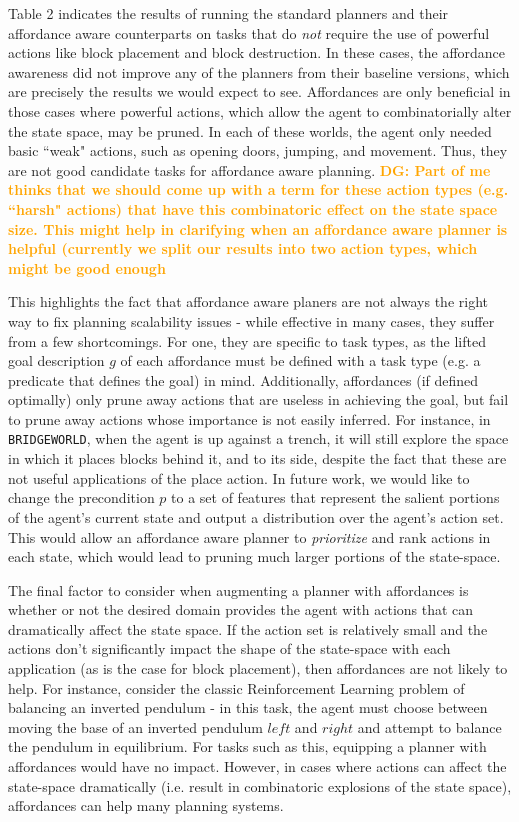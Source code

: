 \documentclass[]{article}
\newcommand{\dgnote}[1]{\textcolor{Orange}{\textbf{DG: #1}}}
\begin{document}
Table 2 indicates the results of running the standard planners and their affordance aware counterparts
on tasks that do {\it not} require the use of powerful actions like block placement and block destruction.
In these cases, the affordance awareness did not improve any of the planners from their baseline versions, which are precisely the results we would expect to see. Affordances are only beneficial in those cases
where powerful actions, which allow the agent to combinatorially alter the state space, may be pruned. In each of these worlds, the agent only needed basic ``weak" actions,
such as opening doors, jumping, and movement. Thus, they are not good candidate tasks for affordance
aware planning.
\dgnote{Part of me thinks that we should come up with a term for these action types (e.g. ``harsh" actions) that have this combinatoric effect on the state space size. This might help in clarifying when an affordance aware planner is helpful (currently we split our results into two action types, which might be good enough}


This highlights the fact that affordance aware planers are not always the right way to fix planning scalability issues - while effective in many cases, they suffer from a few shortcomings. For one, they are specific to task types, as the lifted goal description $g$ of each affordance must be defined with a task type (e.g. a predicate that defines the goal) in mind. Additionally, affordances (if defined optimally) 
only prune away actions that are useless in achieving the goal, 
but fail to prune away actions whose importance is not easily inferred. For instance,
in \texttt{BRIDGEWORLD}, when the agent is up against a trench, it will still explore the space in which it places
blocks behind it, and to its side, despite the fact that these are not useful applications of the place action. In future
work, we would like to change the precondition $p$ to a set of features that represent the salient portions of the agent's
current state and output a distribution over the agent's action set. This would allow an affordance
aware planner to {\it prioritize} and rank actions in each state, which would lead to pruning much larger portions of the state-space.


The final factor to consider when augmenting a planner with affordances is whether or not the desired domain provides
the agent with actions that can dramatically affect the state space. If the action set is relatively small and the actions
don't significantly impact the shape of the state-space with each application (as is the case for block placement), then affordances are not likely to help. For instance, consider the classic Reinforcement Learning problem of balancing an inverted pendulum - in this task, the agent must choose between moving the base of an inverted pendulum $left$ and $right$ and attempt to balance the pendulum in equilibrium. For tasks such as this, equipping a planner with affordances would have no impact. However, in cases where actions can affect the state-space dramatically (i.e. result in combinatoric explosions of the state space), affordances can help many planning systems.
\end{document}
